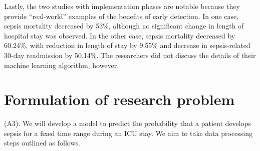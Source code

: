 \documentclass{amia}
\begin{document}
	 Lastly, the two studies with implementation phases
	are notable because they provide ``real-world'' examples
	of the benefits of early detection.  
	 In one case, sepsis mortality decreased by 53\%, although no significant change
	in length of hospital stay was observed.\cite{manaktala2016}
	 In the other case, sepsis mortality decreased by 60.24\%,
	with reduction in length of stay by 9.55\% and decrease in
	sepsis-related 30-day readmission by 50.14\%.\cite{mccoy2017}
	 The researchers did not discuss the details of their machine
	learning algorithm, however.

\section*{Formulation of research problem}

         (A3).
         We will develop a model to predict the probability that a patient
         develops sepsis for a fixed time range during an ICU stay.  We aim to 
         take data processing steps outlined as follows.
\end{document}
